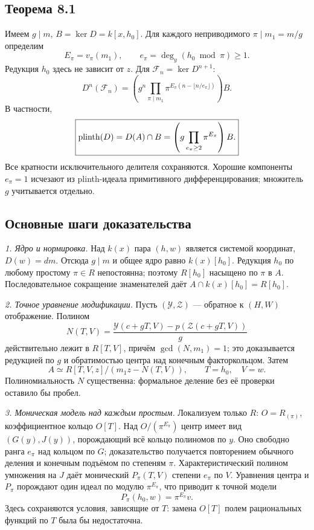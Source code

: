 \subsection*{Теорема 8.1}
Имеем $g\mid m$, $B=\ker D=k[x,h_0]$. Для каждого неприводимого $\pi\mid m_1=m/g$ определим
\[
E_\pi=v_\pi(m_1),\qquad e_\pi=\deg_y(h_0\bmod\pi)\ge1.
\]
Редукция $h_0$ здесь не зависит от $z$. Для $\mathcal F_n=\ker D^{n+1}$:
\[
\boxed{D^n(\mathcal F_n)=
\left(g^n\prod_{\pi\mid m_1}\pi^{E_\pi(n-\lfloor n/e_\pi\rfloor)}\right)B.}
\]
В частности,
\[
\boxed{\operatorname{plinth}(D)=D(A)\cap B=
\left(g\prod_{e_\pi\ge2}\pi^{E_\pi}\right)B.}
\]
Все кратности исключительного делителя сохраняются. Хорошие компоненты $e_\pi=1$ исчезают из plinth-идеала примитивного дифференцирования; множитель $g$ учитывается отдельно.

\subsection*{Основные шаги доказательства}
\textit{1. Ядро и нормировка.} Над $k(x)$ пара $(h,w)$ является системой координат, $D(w)=dm$. Отсюда $g\mid m$ и общее ядро равно $k(x)[h_0]$. Редукция $h_0$ по любому простому $\pi\in R$ непостоянна; поэтому $R[h_0]$ насыщено по $\pi$ в $A$. Последовательное сокращение знаменателей даёт $A\cap k(x)[h_0]=R[h_0]$.

\textit{2. Точное уравнение модификации.} Пусть $(\mathcal Y,\mathcal Z)$ --- обратное к $(H,W)$ отображение. Полином
\[
N(T,V)=\frac{\mathcal Y(c+gT,V)-p(\mathcal Z(c+gT,V))}{g}
\]
действительно лежит в $R[T,V]$, причём $\gcd(N,m_1)=1$; это доказывается редукцией по $g$ и обратимостью центра над конечным факторкольцом. Затем
\[
A\simeq R[T,V,z]/(m_1z-N(T,V)),\qquad T=h_0,\quad V=w.
\]
Полиномиальность $N$ существенна: формальное деление без её проверки оставило бы пробел.

\textit{3. Моническая модель над каждым простым.} Локализуем только $R$: $O=R_{(\pi)}$, коэффициентное кольцо $O[T]$. Над $O/(\pi^{E_\pi})$ центр имеет вид $(G(y),J(y))$, порождающий всё кольцо полиномов по $y$. Оно свободно ранга $e_\pi$ над кольцом по $G$; доказательство получается повторением обычного деления и конечным подъёмом по степеням $\pi$.
Характеристический полином умножения на $J$ даёт монический $P_\pi(T,V)$ степени $e_\pi$ по $V$. Уравнения центра и $P_\pi$ порождают один идеал по модулю $\pi^{E_\pi}$, что приводит к точной модели
\[
P_\pi(h_0,w)=\pi^{E_\pi}v.
\]
Здесь сохраняются условия, зависящие от $T$: замена $O[T]$ полем рациональных функций по $T$ была бы недостаточна.

